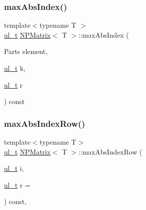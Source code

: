 \subsubsection{\texorpdfstring{maxAbsIndex()}{maxAbsIndex()}}
{\footnotesize\ttfamily template$<$typename T $>$ \\
\mbox{\hyperlink{typedef_8h_a1b140a2034db3f5dfe18a987745df43a}{ul\+\_\+t}} \mbox{\hyperlink{class_n_p_matrix}{N\+P\+Matrix}}$<$ T $>$\+::max\+Abs\+Index (\begin{DoxyParamCaption}\item[{Parts}]{element,  }\item[{\mbox{\hyperlink{typedef_8h_a1b140a2034db3f5dfe18a987745df43a}{ul\+\_\+t}}}]{k,  }\item[{\mbox{\hyperlink{typedef_8h_a1b140a2034db3f5dfe18a987745df43a}{ul\+\_\+t}}}]{r }\end{DoxyParamCaption}) const\hspace{0.3cm}{\ttfamily [protected]}}

\mbox{\label{class_n_p_matrix_a332d3f82121d71e1e349aa450af39207}} 
\subsubsection{\texorpdfstring{maxAbsIndexRow()}{maxAbsIndexRow()}}
{\footnotesize\ttfamily template$<$typename T$>$ \\
\mbox{\hyperlink{typedef_8h_a1b140a2034db3f5dfe18a987745df43a}{ul\+\_\+t}} \mbox{\hyperlink{class_n_p_matrix}{N\+P\+Matrix}}$<$ T $>$\+::max\+Abs\+Index\+Row (\begin{DoxyParamCaption}\item[{\mbox{\hyperlink{typedef_8h_a1b140a2034db3f5dfe18a987745df43a}{ul\+\_\+t}}}]{i,  }\item[{\mbox{\hyperlink{typedef_8h_a1b140a2034db3f5dfe18a987745df43a}{ul\+\_\+t}}}]{r = {} }\end{DoxyParamCaption}) const\hspace{0.3cm}{\ttfamily [inline]}, {\ttfamily [protected]}}

\mbox{\label{class_n_p_matrix_a2b5a2c3d646df900367ad91450d1ef33}} 
